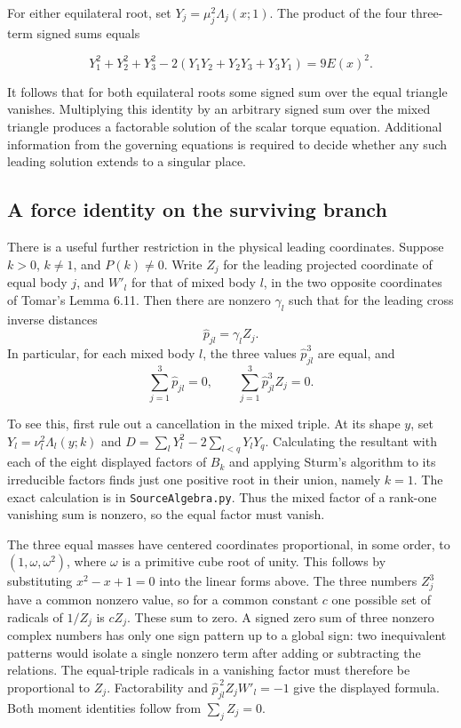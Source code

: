 \documentclass[11pt]{article}
\begin{document}
For either equilateral root, set \(Y_j=\mu_j^2\Lambda_j(x;1)\). The product of the four three-term signed sums equals

\[
Y_1^2+Y_2^2+Y_3^2-2(Y_1Y_2+Y_2Y_3+Y_3Y_1)=9E(x)^2.
\]

It follows that for both equilateral roots some signed sum over the equal triangle vanishes. Multiplying this identity by an arbitrary signed sum over the mixed triangle produces a factorable solution of the scalar torque equation. Additional information from the governing equations is required to decide whether any such leading solution extends to a singular place.

\subsection*{A force identity on the surviving branch}

There is a useful further restriction in the physical leading coordinates. Suppose
\(k>0\), \(k\ne1\), and \(P(k)\ne0\). Write \(Z_j\) for the leading
projected coordinate of equal body \(j\), and \(W'_l\) for that of mixed
body \(l\), in the two opposite coordinates of Tomar's Lemma 6.11. Then
there are nonzero \(\gamma_l\) such that for the leading cross inverse
distances
\[
   \widehat p_{jl}=\gamma_l Z_j .
\]
In particular, for each mixed body \(l\), the three values
\(\widehat p_{jl}^3\) are equal, and
\[
\sum_{j=1}^3\widehat p_{jl}=0,\qquad
\sum_{j=1}^3\widehat p_{jl}^3 Z_j=0.
\]

To see this, first rule out a cancellation in the mixed triple.
At its shape \(y\), set \(Y_l=\nu_l^2\Lambda_l(y;k)\) and
\(D=\sum_lY_l^2-2\sum_{l<q}Y_lY_q\). Calculating the resultant with
each of the eight displayed factors of \(B_k\) and applying Sturm's
algorithm to its irreducible factors finds just one positive root in
their union, namely \(k=1\). The exact calculation is in
\texttt{SourceAlgebra.py}. Thus the mixed factor of a rank-one
vanishing sum is nonzero, so the equal factor must vanish.

The three equal masses have centered coordinates proportional, in some
order, to \((1,\omega,\omega^2)\), where \(\omega\) is a primitive cube
root of unity. This follows by substituting \(x^2-x+1=0\) into the
linear forms above. The three numbers \(Z_j^3\) have a common nonzero
value, so for a common constant \(c\) one possible set of radicals
of \(1/Z_j\) is \(cZ_j\). These sum to zero. A signed zero sum of
three nonzero complex numbers has only one sign pattern up to a
global sign: two inequivalent patterns would isolate a single nonzero
term after adding or subtracting the relations. The equal-triple
radicals in a vanishing factor must therefore be proportional to
\(Z_j\). Factorability and
\(\widehat p_{jl}^{\,2}Z_jW'_l=-1\) give the displayed formula.
Both moment identities follow from \(\sum_j Z_j=0\).
\end{document}
